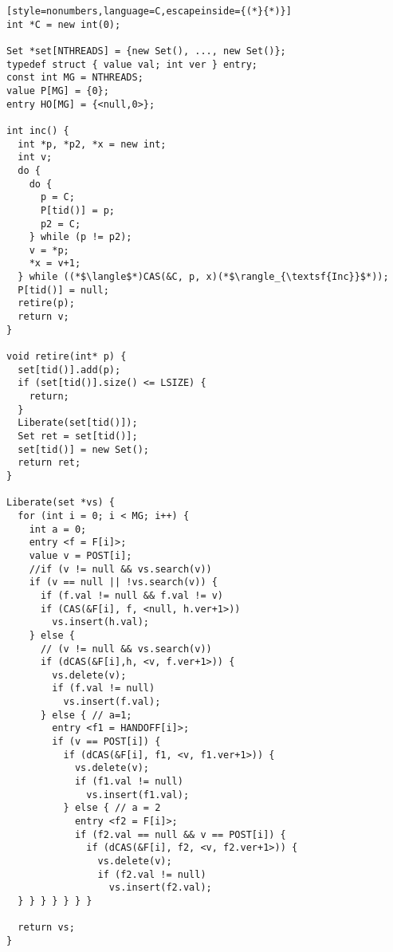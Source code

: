 \begin{figure*}
{\small
\begin{lstlisting}[style=nonumbers,language=C,escapeinside={(*}{*)}]
int *C = new int(0);

Set *set[NTHREADS] = {new Set(), ..., new Set()};
typedef struct { value val; int ver } entry;
const int MG = NTHREADS;
value P[MG] = {0};  
entry HO[MG] = {<null,0>}; 

int inc() {
  int *p, *p2, *x = new int;
  int v;
  do {
    do {
      p = C;
      P[tid()] = p;
      p2 = C;
    } while (p != p2);
    v = *p;
    *x = v+1;
  } while ((*$\langle$*)CAS(&C, p, x)(*$\rangle_{\textsf{Inc}}$*));
  P[tid()] = null;
  retire(p);
  return v;
}

void retire(int* p) {  
  set[tid()].add(p);
  if (set[tid()].size() <= LSIZE) {
    return;
  }
  Liberate(set[tid()]);
  Set ret = set[tid()]; 
  set[tid()] = new Set();
  return ret;
}

Liberate(set *vs) {  
  for (int i = 0; i < MG; i++) {  
    int a = 0;
    entry <f = F[i]>;
    value v = POST[i];
    //if (v != null && vs.search(v)) 
    if (v == null || !vs.search(v)) {
      if (f.val != null && f.val != v) 
      if (CAS(&F[i], f, <null, h.ver+1>)) 
        vs.insert(h.val);
    } else {
      // (v != null && vs.search(v))       
      if (dCAS(&F[i],h, <v, f.ver+1>)) { 
        vs.delete(v);
        if (f.val != null) 
          vs.insert(f.val);
      } else { // a=1;
        entry <f1 = HANDOFF[i]>;
        if (v == POST[i]) {
          if (dCAS(&F[i], f1, <v, f1.ver+1>)) { 
            vs.delete(v);
            if (f1.val != null) 
              vs.insert(f1.val);
          } else { // a = 2
            entry <f2 = F[i]>;
            if (f2.val == null && v == POST[i]) {
              if (dCAS(&F[i], f2, <v, f2.ver+1>)) { 
                vs.delete(v);
                if (f2.val != null) 
                  vs.insert(f2.val);
  } } } } } } }

  return vs;
}

\end{lstlisting}
}
\end{figure*}

